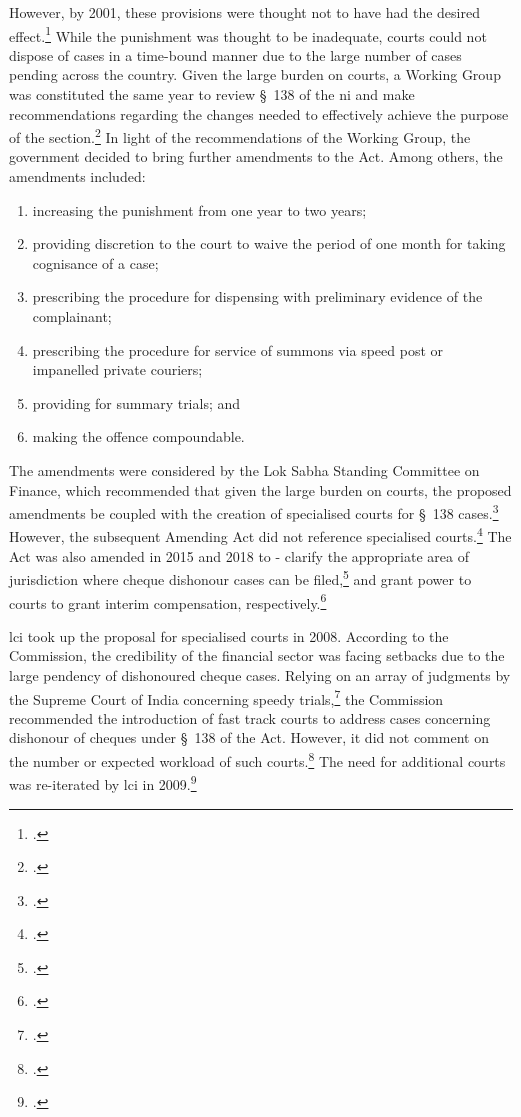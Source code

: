 However, by 2001, these provisions were thought not to have had the desired effect.\footcite{stdcomm2001_138niAct} While the punishment was thought to be inadequate, courts could not dispose of cases in a time-bound manner due to the large number of cases pending across the country. Given the large burden on courts, a Working Group was constituted the same year to review \S~138 of the \gls{ni} and make recommendations regarding the changes needed to effectively achieve the purpose of the section.\footcite{wg2001_138} In light of the recommendations of the Working Group, the government decided to bring further amendments to the Act. Among others, the amendments included:

\begin{enumerate}[label=(\alph*)]
 \item increasing the punishment from one year to two years;
 \item providing discretion to the court to waive the period of one month for taking cognisance of a case;
 \item prescribing the procedure for dispensing with preliminary evidence of the complainant;
 \item prescribing the procedure for service of summons via speed post or impanelled private couriers;
 \item providing for summary trials; and
 \item making the offence compoundable.
\end{enumerate}

The amendments were considered by the Lok Sabha Standing Committee on Finance, which recommended that given the large burden on courts, the proposed amendments be coupled with the creation of specialised courts for \S~138 cases.\footcite{stdcomm2001_138niAct} However, the subsequent Amending Act did not reference specialised courts.\footcite{niAmend2002} The Act was also amended in 2015 and 2018 to - clarify the appropriate area of jurisdiction where cheque dishonour cases can be filed,\footcite{niAmend2015} and grant power to courts to grant interim compensation, respectively.\footcite{niAmend2018}

\gls{lci} took up the proposal for specialised courts in 2008. According to the Commission, the credibility of the financial sector was facing setbacks due to the large pendency of dishonoured cheque cases. Relying on an array of judgments by the Supreme Court of India concerning speedy trials,\footcite{sc1978_khatoon, sc1981_champalal, sc2005_surinder, sc2008_krishna} the Commission recommended the introduction of fast track courts to address cases concerning dishonour of cheques under \S~138 of the Act. However, it did not comment on the number or expected workload of such courts.\footcite{lci2008_138} The need for additional courts was re-iterated by \gls{lci} in 2009.\footcite{lci2009_reforms}

